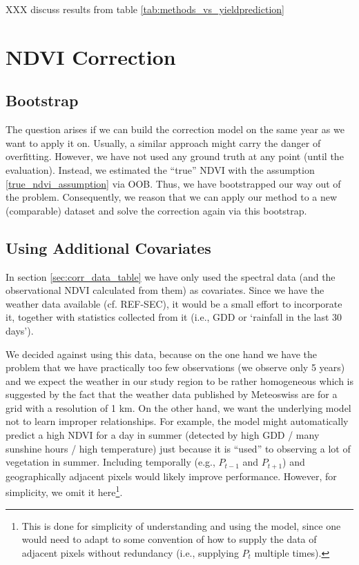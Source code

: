 XXX discuss results from table \ref{tab:methods_vs_yieldprediction}

\section{NDVI Correction}{
    \subsection{Bootstrap}
        The question arises if we can build the correction model on the same year as we want to apply it on. Usually, a similar approach might carry the danger of overfitting. However, we have not used any ground truth at any point (until the evaluation). Instead, we estimated the ``true'' NDVI with the assumption \ref{true_ndvi_assumption} via OOB. Thus, we have bootstrapped our way out of the problem. Consequently, we reason that we can apply our method to a new (comparable) dataset and solve the correction again via this bootstrap.
    \subsection{Using Additional Covariates}{
        In section \ref{sec:corr_data_table} we have only used the spectral data (and the observational NDVI calculated from them) as covariates. Since we have the weather data available (cf. REF-SEC), it would be a small effort to incorporate it, together with statistics collected from it (i.e., GDD or `rainfall in the last 30 days'). 
    
        We decided against using this data, because on the one hand we have the problem that we have practically too few observations (we observe only 5 years) and we expect the weather in our study region to be rather homogeneous which is suggested by the fact that the weather data published by Meteoswiss are for a grid with a resolution of 1 km. On the other hand, we want the underlying model not to learn improper relationships. For example, the model might automatically predict a high NDVI for a day in summer (detected by high GDD / many sunshine hours / high temperature) just because it is ``used'' to observing a lot of vegetation in summer. 
        Including temporally (e.g., $P_{t-1}$ and $P_{t+1}$) and geographically adjacent pixels would likely improve performance. However, for simplicity, we omit it here\footnote{This is done for simplicity of understanding and using the model, since one would need to adapt to some convention of how to supply the data of adjacent pixels without redundancy (i.e., supplying $P_t$ multiple times).}.
    }

}
